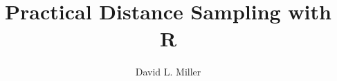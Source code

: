 \documentclass[graybox,envcountchap,sectrefs]{svmono}
\begin{document}
\author{David L. Miller}
\title{Practical Distance Sampling with R}
\maketitle

\frontmatter%

%
%
%
%

\tableofcontents

%


\mainmatter%

%
%
%

\backmatter%
%
%



\printindex

\end{document}
